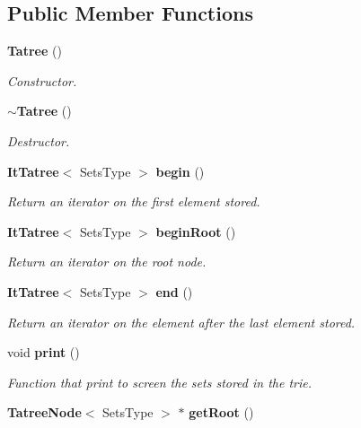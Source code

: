 \subsection*{Public Member Functions}
\begin{CompactItemize}
\item 
{\bf Tatree} ()\label{class_tatree_7ba7fda13c2987a2840c07164c2d17e6}

\begin{CompactList}\small\item\em Constructor. \item\end{CompactList}\item 
{\bf $\sim$Tatree} ()\label{class_tatree_d54e3fb0fc9525949c010f9290fb97f7}

\begin{CompactList}\small\item\em Destructor. \item\end{CompactList}\item 
{\bf It\-Tatree}$<$ Sets\-Type $>$ {\bf begin} ()\label{class_tatree_383cce0f85279182e9eb5e19015cae0f}

\begin{CompactList}\small\item\em Return an iterator on the first element stored. \item\end{CompactList}\item 
{\bf It\-Tatree}$<$ Sets\-Type $>$ {\bf begin\-Root} ()\label{class_tatree_14ef8d3302fb0d1f520a39b09ba71b65}

\begin{CompactList}\small\item\em Return an iterator on the root node. \item\end{CompactList}\item 
{\bf It\-Tatree}$<$ Sets\-Type $>$ {\bf end} ()\label{class_tatree_7dea4be6a2c8914398d8073189c7e845}

\begin{CompactList}\small\item\em Return an iterator on the element after the last element stored. \item\end{CompactList}\item 
void {\bf print} ()\label{class_tatree_2690856037aef1ae34a711b5f4136069}

\begin{CompactList}\small\item\em Function that print to screen the sets stored in the trie. \item\end{CompactList}\item 
{\bf Tatree\-Node}$<$ Sets\-Type $>$ $\ast$ {\bf get\-Root} ()\label{class_tatree_940b8597e71da99ff8bc673aaad7a53b}


\end{CompactItemize}
